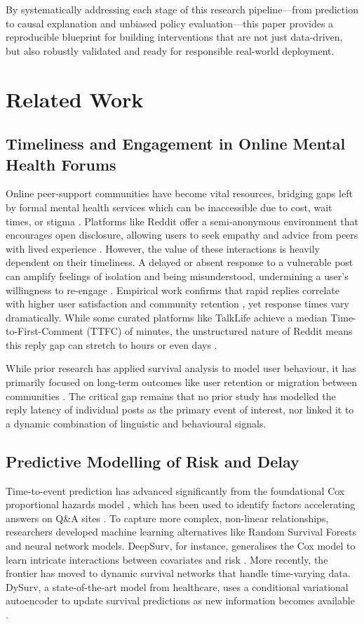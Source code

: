 \documentclass[letterpaper]{article} %
\begin{document}
By systematically addressing each stage of this research pipeline—from prediction to causal explanation and unbiased policy evaluation—this paper provides a reproducible blueprint for building interventions that are not just data-driven, but also robustly validated and ready for responsible real-world deployment.

\section{Related Work}
\subsection{Timeliness and Engagement in Online Mental Health Forums}
Online peer-support communities have become vital resources, bridging gaps left by formal mental health services which can be inaccessible due to cost, wait times, or stigma \cite{merchant2022opportunities,deng2023role}. Platforms like Reddit offer a semi-anonymous environment that encourages open disclosure, allowing users to seek empathy and advice from peers with lived experience \cite{de2014mental}. However, the value of these interactions is heavily dependent on their timeliness. A delayed or absent response to a vulnerable post can amplify feelings of isolation and being misunderstood, undermining a user's willingness to re-engage \cite{marshall2024understanding}. Empirical work confirms that rapid replies correlate with higher user satisfaction and community retention \cite{pan2017you}, yet response times vary dramatically. While some curated platforms like TalkLife achieve a median Time-to-First-Comment (TTFC) of minutes, the unstructured nature of Reddit means this reply gap can stretch to hours or even days \cite{sharma2020engagement}.

While prior research has applied survival analysis to model user behaviour, it has primarily focused on long-term outcomes like user retention or migration between communities \cite{wan2019social}. The critical gap remains that no prior study has modelled the reply latency of individual posts as the primary event of interest, nor linked it to a dynamic combination of linguistic and behavioural signals.

\subsection{Predictive Modelling of Risk and Delay}
Time-to-event prediction has advanced significantly from the foundational Cox proportional hazards model \cite{cox1972regression}, which has been used to identify factors accelerating answers on Q\&A sites \cite{anderson2012discovering}. To capture more complex, non-linear relationships, researchers developed machine learning alternatives like Random Survival Forests and neural network models. DeepSurv, for instance, generalises the Cox model to learn intricate interactions between covariates and risk \cite{katzman2018deepsurv}. More recently, the frontier has moved to dynamic survival networks that handle time-varying data. DySurv, a state-of-the-art model from healthcare, uses a conditional variational autoencoder to update survival predictions as new information becomes available \cite{mesinovic2024dysurv}.
\end{document}
